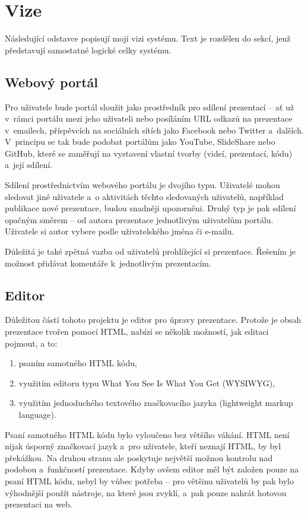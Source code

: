 \documentclass[11pt,twoside,a4paper]{book}
\newcommand*{\nomExpl}[2]{#2 (#1)\nomenclature{#1}{#2}} 	%
\begin{document}
\section{Vize}
Následující odstavce popisují mojí vizi systému. Text je rozdělen do sekcí, jenž představují samostatné logické celky systému.

\subsection{Webový portál}
Pro uživatele bude portál sloužit jako prostředník pro sdílení prezentací – ať už v~rámci portálu mezi jeho uživateli nebo
posíláním URL odkazů na prezentace v~emailech, příspěvcích na sociálních sítích jako Facebook nebo Twitter a~dalších. V~principu se tak bude podobat portálům jako YouTube, SlideShare nebo GitHub, které se zaměřují na vystavení vlastní tvorby (videí, prezentací, kódu) a~její sdílení.

Sdílení prostřednictvím webového portálu je dvojího typu. Uživatelé mohou sledovat jiné uživatele a~o aktivitách těchto sledovaných uživatelů, například publikace nové prezentace, budou snadněji upozorněni. Druhý typ je pak sdílení opačným směrem – od autora prezentace jednotlivým uživatelům portálu. Uživatele si autor vybere podle uživatelského jména či e-mailu.

Důležitá je také zpětná vazba od uživatelů prohlížející si prezentace. Řešením je možnost přidávat komentáře k~jednotlivým prezentacím.

\subsection{Editor}
Důležitou částí tohoto projektu je editor pro úpravy prezentace. Protože je obsah prezentace tvořen pomocí HTML, nabízí se
několik možností, jak editaci pojmout, a to:

\begin{enumerate}
	\item psaním samotného HTML kódu,
	\item využitím editoru typu \nomExpl{WYSIWYG}{What You See Is What You Get},
	\item využitím jednoduchého textového značkovacího jazyka (lightweight markup language).
\end{enumerate}

Psaní samotného HTML kódu bylo vyloučeno bez většího váhání. HTML není nijak úsporný značkovací jazyk a~pro uživatele, kteří neznají HTML, by byl překážkou. Na druhou stranu ale poskytuje největší možnou kontrolu nad podobou a~funkčností prezentace. Kdyby ovšem editor měl být založen pouze na psaní HTML kódu, nebyl by vůbec potřeba – pro většinu uživatelů by pak bylo výhodnější použít nástroje, na které jsou zvyklí, a~pak pouze nahrát hotovou prezentaci na web.
\end{document}
